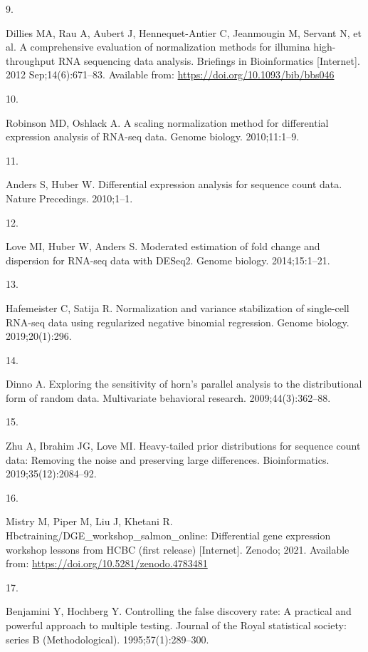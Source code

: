 \documentclass[
  a4paper,
]{scrreprt}
\newlength{\cslhangindent}
\newlength{\csllabelwidth}
\newenvironment{CSLReferences}[2] %
 {\begin{list}{}{%
  \setlength{\itemindent}{0pt}
  \setlength{\leftmargin}{0pt}
  \setlength{\parsep}{0pt}
  \ifodd #1
   \setlength{\leftmargin}{\cslhangindent}
   \setlength{\itemindent}{-1\cslhangindent}
  \fi
  \setlength{\itemsep}{#2\baselineskip}}}
 {\end{list}}
\newcommand{\CSLLeftMargin}[1]{\parbox[t]{\csllabelwidth}{\strut#1\strut}}
\newcommand{\CSLRightInline}[1]{\parbox[t]{\linewidth - \csllabelwidth}{\strut#1\strut}}
\begin{document}
\begin{CSLReferences}{0}{1}
\CSLLeftMargin{9. }%
\CSLRightInline{Dillies MA, Rau A, Aubert J, Hennequet-Antier C,
Jeanmougin M, Servant N, et al. A comprehensive evaluation of
normalization methods for illumina high-throughput RNA sequencing data
analysis. Briefings in Bioinformatics {[}Internet{]}. 2012
Sep;14(6):671--83. Available from:
\url{https://doi.org/10.1093/bib/bbs046}}

\CSLLeftMargin{10. }%
\CSLRightInline{Robinson MD, Oshlack A. A scaling normalization method
for differential expression analysis of RNA-seq data. Genome biology.
2010;11:1--9. }

\CSLLeftMargin{11. }%
\CSLRightInline{Anders S, Huber W. Differential expression analysis for
sequence count data. Nature Precedings. 2010;1--1. }

\CSLLeftMargin{12. }%
\CSLRightInline{Love MI, Huber W, Anders S. Moderated estimation of fold
change and dispersion for RNA-seq data with DESeq2. Genome biology.
2014;15:1--21. }

\CSLLeftMargin{13. }%
\CSLRightInline{Hafemeister C, Satija R. Normalization and variance
stabilization of single-cell RNA-seq data using regularized negative
binomial regression. Genome biology. 2019;20(1):296. }

\CSLLeftMargin{14. }%
\CSLRightInline{Dinno A. Exploring the sensitivity of horn's parallel
analysis to the distributional form of random data. Multivariate
behavioral research. 2009;44(3):362--88. }

\CSLLeftMargin{15. }%
\CSLRightInline{Zhu A, Ibrahim JG, Love MI. Heavy-tailed prior
distributions for sequence count data: Removing the noise and preserving
large differences. Bioinformatics. 2019;35(12):2084--92. }

\CSLLeftMargin{16. }%
\CSLRightInline{Mistry M, Piper M, Liu J, Khetani R.
Hbctraining/DGE\_workshop\_salmon\_online: Differential gene expression
workshop lessons from HCBC (first release) {[}Internet{]}. Zenodo; 2021.
Available from: \url{https://doi.org/10.5281/zenodo.4783481}}

\CSLLeftMargin{17. }%
\CSLRightInline{Benjamini Y, Hochberg Y. Controlling the false discovery
rate: A practical and powerful approach to multiple testing. Journal of
the Royal statistical society: series B (Methodological).
1995;57(1):289--300. }


\end{CSLReferences}
\end{document}
